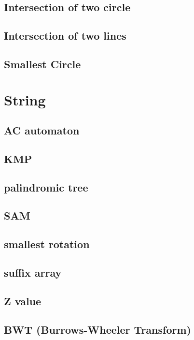 	\subsection{Intersection of two circle}
		
	\subsection{Intersection of two lines}
		
	\subsection{Smallest Circle}
		

\section{String}
	\subsection{AC automaton}
		
	\subsection{KMP}
		
	\subsection{palindromic tree}
		
	\subsection{SAM}
		
	\subsection{smallest rotation }
		
	\subsection{suffix array}
		
	\subsection{Z value}
		
	\subsection{BWT (Burrows-Wheeler Transform)}
		

